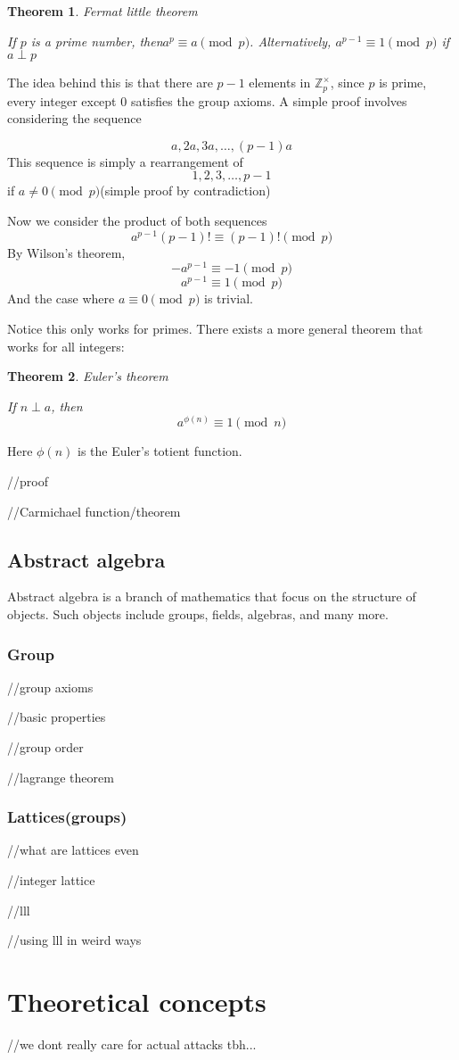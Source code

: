\documentclass{report}
\newtheorem{theorem}{Theorem}[section]
\begin{document}
\begin{theorem}
	Fermat little theorem
	
	If $p$ is a prime number, then$a^p\equiv a\pmod p$. Alternatively, $a^{p-1}\equiv1\pmod p$ if $a\perp p$
\end{theorem}
The idea behind this is that there are $p-1$ elements in $\mathbb{Z}_p^\times$, since $p$ is prime, every integer except $0$ satisfies the group axioms. A simple proof involves considering the sequence

$$a,2a,3a,\dots,(p-1)a$$
This sequence is simply a rearrangement of 
$$1,2,3,\dots,p-1$$
if $a\neq 0\pmod p$(simple proof by contradiction)

Now we consider the product of both sequences
$$a^{p-1}(p-1)!\equiv(p-1)!\pmod p$$
By Wilson's theorem,
$$-a^{p-1}\equiv-1\pmod p$$
$$a^{p-1}\equiv1\pmod p$$
And the case where $a\equiv0\pmod p$ is trivial.

Notice this only works for primes. There exists a more general theorem that works for all integers:
\begin{theorem}
	Euler's theorem
	
	If $n\perp a$, then $$a^{\phi(n)}\equiv1\pmod n$$
\end{theorem}
Here $\phi(n)$ is the Euler's totient function.

//proof	

//Carmichael function/theorem
\chapter{Abstract algebra}
Abstract algebra is a branch of mathematics that focus on the structure of objects. Such objects include groups, fields, algebras, and many more.

\section{Group}
//group axioms

//basic properties

//group order

//lagrange theorem
\section{Lattices(groups)}
//what are lattices even

//integer lattice

//lll

//using lll in weird ways
\part{Theoretical concepts}
//we dont really care for actual attacks tbh...
\end{document}
